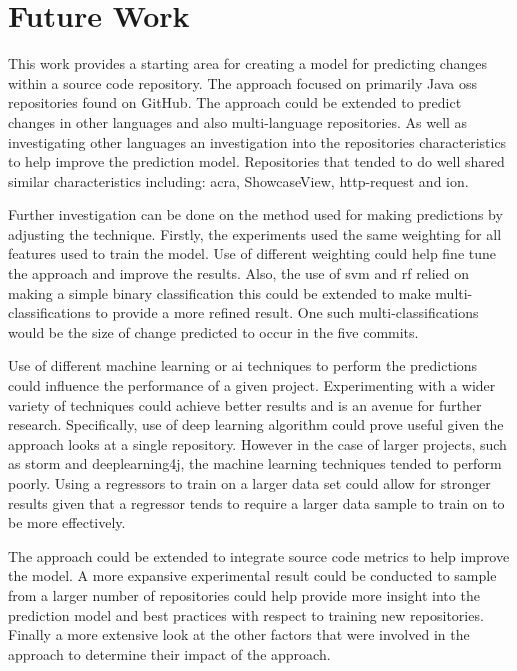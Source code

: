 \section{Future Work}

This work provides a starting area for creating a model for predicting changes within a source code repository. The approach focused on primarily Java \gls{oss} repositories found on GitHub. The approach could be extended to predict changes in other languages and also multi-language repositories. As well as investigating other languages an investigation into the repositories characteristics to help improve the prediction model. Repositories that tended to do well shared similar characteristics including: acra, ShowcaseView, http-request and ion.

Further investigation can be done on the method used for making predictions by adjusting the technique. Firstly, the experiments used the same weighting for all features used to train the model. Use of different weighting could help fine tune the approach and improve the results. Also, the use of \gls{svm} and \gls{rf} relied on making a simple binary classification this could be extended to make multi-classifications to provide a more refined result. One such multi-classifications would be the size of change predicted to occur in the five commits.

Use of different machine learning or \gls{ai} techniques to perform the predictions could influence the performance of a given project. Experimenting with a wider variety of techniques could achieve better results and is an avenue for further research. Specifically, use of deep learning algorithm could prove useful given the approach looks at a single repository. However in the case of larger projects, such as storm and deeplearning4j, the machine learning techniques tended to perform poorly. Using a regressors to train on a larger data set could allow for stronger results given that a regressor tends to require a larger data sample to train on to be more effectively.


The approach could be extended to integrate source code metrics to help improve the model. A more expansive experimental result could be conducted to sample from a larger number of repositories could help provide more insight into the prediction model and best practices with respect to training new repositories. Finally a more extensive look at the other factors that were involved in the approach to determine their impact of the approach.